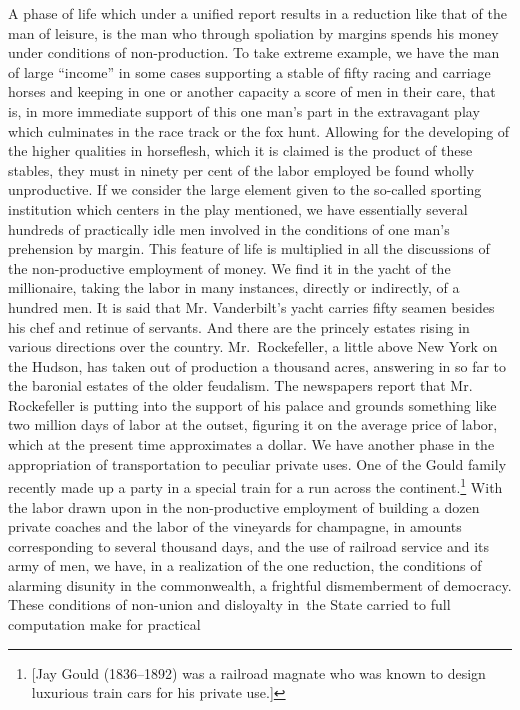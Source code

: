 \documentclass[twoside,symmetric,nobib,justified]{tufte-book}
\begin{document}
A phase of life which under a unified report results in a reduction like
that of the man of leisure, is the man who through spoliation by margins
spends his money under conditions of non-production. To take extreme
example, we have the man of large ``income'' in some cases supporting a
stable of fifty racing and carriage horses and keeping in one or another
capacity a score of men in their care, that is, in more immediate
support of this one man's part in the extravagant play which culminates
in the race track or the fox hunt. Allowing for the developing of the
higher qualities in horseflesh, which it is claimed is the product of
these stables, they must in ninety per cent of the labor employed be
found wholly unproductive. If we consider the large element given to the
so-called sporting institution which centers in the play mentioned, we
have essentially several hundreds of practically idle men involved in
the conditions of one man's prehension by margin. This feature of life
is multiplied in all the discussions of the non-productive employment of
money. We find it in the yacht of the millionaire, taking the labor in
many instances, directly or indirectly, of a hundred men. It is said
that Mr. Vanderbilt's yacht carries fifty seamen besides his chef and
retinue of servants. And there are the princely estates rising in
various directions over the country. Mr.~Rockefeller, a little above New
York on the Hudson, has taken out of production a thousand acres,
answering in so far to the baronial estates of the older feudalism. The
newspapers report that Mr. Rockefeller is putting into the support of
his palace and grounds something like two million days of labor at the
outset, figuring it on the average price of labor, which at the present
time approximates a dollar. We have another phase in the appropriation
of transportation to peculiar private uses. One of the Gould family
recently made up a party in a special train for a run across the
continent.\footnote{{[}Jay Gould (1836--1892) was a railroad magnate who
  was known to design luxurious train cars for his private use.{]}} With
the labor drawn upon in the non-productive employment of building a
dozen private coaches and the labor of the vineyards for champagne, in
amounts corresponding to several thousand days, and the use of railroad
service and its army of men, we have, in a realization of the one
reduction, the conditions of alarming disunity in the commonwealth, a
frightful dismemberment of democracy. These conditions of non-union and
disloyalty in~the State carried to full computation make for practical
\end{document}
